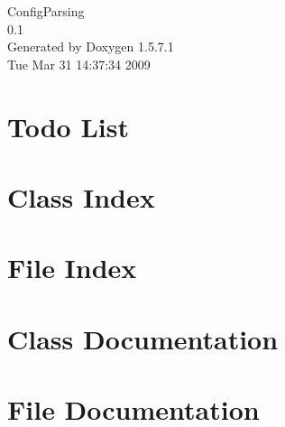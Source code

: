 \documentclass[a4paper]{book}
\begin{document}
\begin{titlepage}
\vspace*{7cm}
\begin{center}
{\Large ConfigParsing \\[1ex]\large 0.1 }\\
\vspace*{1cm}
{\large Generated by Doxygen 1.5.7.1}\\
\vspace*{0.5cm}
{\small Tue Mar 31 14:37:34 2009}\\
\end{center}
\end{titlepage}
\clearemptydoublepage
{}
\tableofcontents
\clearemptydoublepage
{}
\chapter{Todo List}
\label{todo}

\chapter{Class Index}

\chapter{File Index}

\chapter{Class Documentation}








\chapter{File Documentation}








\printindex
\end{document}
